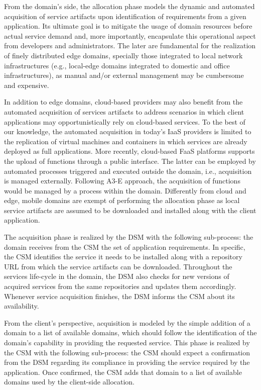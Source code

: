 From the domain's side, the allocation phase models the dynamic and automated acquisition of service artifacts upon identification of requirements from a given application. Its ultimate goal is to mitigate the usage of domain resources before actual service demand and, more importantly, encapsulate this operational aspect from developers and administrators. The later are fundamental for the realization of finely distributed edge domains, specially those integrated to local network infrastructures (e.g., local-edge domains integrated to domestic and office infrastructures), as manual and/or external management may be cumbersome and expensive.

In addition to edge domains, cloud-based providers may also benefit from the automated acquisition of services artifacts to address scenarios in which client applications may opportunistically rely on cloud-based services. To the best of our knowledge, the automated acquisition in today's IaaS providers is limited to the replication of virtual machines and containers in which services are already deployed as full applications. More recently, cloud-based FaaS platforms supports the upload of functions through a public interface. The latter can be employed by automated processes triggered and executed outside the domain, i.e., acquisition is managed externally. Following A3-E approach, the acquisition of functions would be managed by a process within the domain. Differently from cloud and edge, mobile domains are exempt of performing the allocation phase as local service artifacts are assumed to be downloaded and installed along with the client application.

The acquisition phase is realized by the DSM with the following sub-process: the domain receives from the CSM the set of application requirements. In specific, the CSM identifies the service it needs to be installed along with a repository URL from which the service artifacts can be downloaded. Throughout the services life-cycle in the domain, the DSM also checks for new versions of acquired services from the same repositories and updates them accordingly. Whenever service acquisition finishes, the DSM informs the CSM about its availability.

From the client's perspective, acquisition is modeled by the simple addition of a domain to a list of available domains, which should follow the identification of the domain's capability in providing the requested service. This phase is realized by the CSM with the following sub-process: the CSM should expect a confirmation from the DSM regarding its compliance in providing the service required by the application. Once confirmed, the CSM adds that domain to a list of available domains used by the client-side allocation. 

